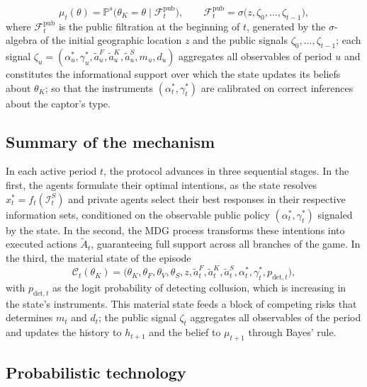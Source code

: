 \documentclass[pdflatex,sn-mathphys-ay]{sn-jnl}
\theoremstyle{plain}
\theoremstyle{definition}
\newcommand{\Prob}{\mathbb{P}}
\newcommand{\1}{\mathbf{1}}
\begin{document}
\[
\mu_t(\theta)=\Prob^s\!\bigl(\theta_K=\theta\mid\mathcal{F}_t^{\mathrm{pub}}\bigr),\qquad \mathcal{F}_t^{\mathrm{pub}}=\sigma\bigl(z,\zeta_0,\ldots,\zeta_{t-1}\bigr),
\]
where $\mathcal{F}_t^{\mathrm{pub}}$ is the public filtration at the beginning of $t$, generated by the $\sigma$-algebra of the initial geographic location $z$ and the public signals $\zeta_0,\ldots,\zeta_{t-1}$; each signal $\zeta_u=(\alpha_u^\ast,\gamma_u^\ast,\tilde{a}_u^F,\tilde{a}_u^K,\tilde{a}_u^S,m_u,d_u)$ aggregates all observables of period $u$ and constitutes the informational support over which the state updates its beliefs about $\theta_K$; so that the instruments $(\alpha_t^\ast,\gamma_t^\ast)$ are calibrated on correct inferences about the captor's type.

\subsection{Summary of the mechanism}\label{subsec:resumen-mecanismo}

In each active period $t$, the protocol advances in three sequential stages. In the first, the agents formulate their optimal intentions, as the state resolves $x_t^\ast=f_t(\mathcal{I}_t^S)$ and private agents select their best responses in their respective information sets, conditioned on the observable public policy $(\alpha_t^\ast,\gamma_t^\ast)$ signaled by the state. In the second, the MDG process transforms these intentions into executed actions $\tilde{A}_t$, guaranteeing full support across all branches of the game. In the third, the material state of the episode
\[
\mathcal{C}_t(\theta_K)=\bigl(\theta_K,\theta_F,\theta_V,\theta_S,z,\tilde{a}_t^F,\tilde{a}_t^K,\tilde{a}_t^S,\alpha_t^\ast,\gamma_t^\ast,p_{\mathrm{det},t}\bigr),
\]
with $p_{\mathrm{det},t}$ as the logit probability of detecting collusion, which is increasing in the state's instruments. This material state feeds a block of competing risks that determines $m_t$ and $d_t$; the public signal $\zeta_t$ aggregates all observables of the period and updates the history to $h_{t+1}$ and the belief to $\mu_{t+1}$ through Bayes' rule.

\subsection{Probabilistic technology}\label{subsec:prob-tech}
\end{document}
